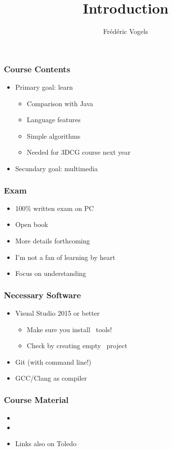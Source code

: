 \documentclass{../pvm-slides}
\title{Introduction}
\author{Fr\'ed\'eric Vogels}
\begin{document}
\begin{frame}
  \titlepage
\end{frame}

\begin{frame}
  \frametitle{Course Contents}
  \Large
  \begin{itemize}
    \item Primary goal: learn \cpp
          \begin{itemize}
            \item Comparison with Java
            \item Language features
            \item Simple algorithms
            \item Needed for 3DCG course next year
          \end{itemize}
    \item Secundary goal: multimedia
  \end{itemize}
\end{frame}

\begin{frame}
  \frametitle{Exam}
  \Large
  \begin{itemize}
    \item 100\% written exam on PC
    \item Open book
    \item More details forthcoming
    \item I'm not a fan of learning by heart
    \item Focus on understanding
  \end{itemize}
\end{frame}

\begin{frame}
  \frametitle{Necessary Software}
  \Large
  \begin{itemize}
    \item Visual Studio 2015 or better
          \begin{itemize}
            \item Make sure you install \cpp\ tools!
            \item Check by creating empty \cpp\ project
          \end{itemize}
    \item Git (with command line!)
  \end{itemize}
  \vskip5mm
  \begin{itemize}
    \item GCC/Clang as compiler
  \end{itemize}
\end{frame}

\begin{frame}
  \frametitle{Course Material} \Large
  \begin{itemize}
    \item {}
    \item {}
    \item Links also on Toledo
  \end{itemize}
\end{frame}
\end{document}
